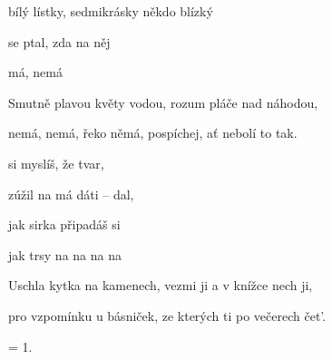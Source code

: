 

\zs
{} bílý lístky, sedmikrásky někdo blízký

 se ptal, zda na něj 

má, nemá 
\ks

\zs
Smutně plavou květy vodou, rozum pláče nad náhodou,

nemá, nemá, řeko němá, pospíchej, ať nebolí to tak.
\ks

\zr
{} si myslíš, že  tvar,

 zúžil na má dáti -- dal,

jak  sirka připadáš si 

jak  trsy  na na na na 
\kr

\zs
Uschla kytka na kamenech, vezmi ji a v knížce nech ji,

pro vzpomínku u básniček, ze kterých ti po večerech čet'.
\ks

\zr
\kr

\zs
= 1.
\ks

\kp
